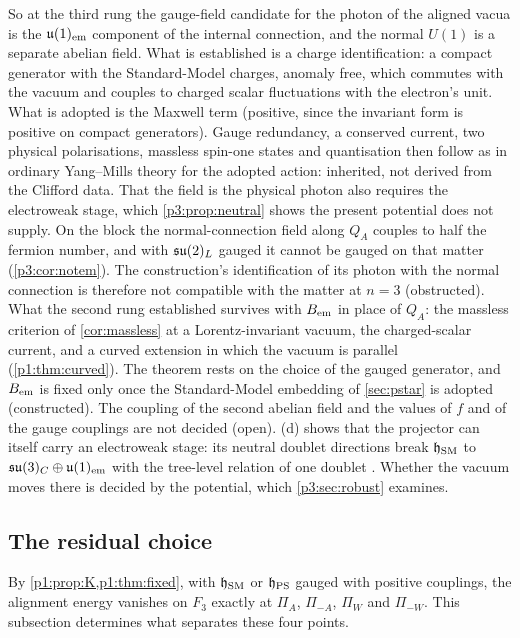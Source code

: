 So at the third rung the gauge-field candidate for the photon of the aligned vacua is the $\mathfrak{u}(1)_{\rm em}$ component of the internal connection, and the normal
$U(1)$ is a separate abelian field. What is established is a charge identification: a compact generator with the Standard-Model charges, anomaly free, which
commutes with the vacuum and couples to charged scalar fluctuations with the electron's unit. What is adopted is the Maxwell term (positive, since the
invariant form is positive on compact generators). Gauge redundancy, a conserved current, two physical polarisations, massless spin-one states and
quantisation then follow as in ordinary Yang--Mills theory for the adopted action: inherited, not derived from the Clifford data. That the field is the
physical photon also requires the electroweak stage, which \cref{p3:prop:neutral} shows the present potential does not supply. On
the block the normal-connection field along $Q_A$ couples to half the fermion number, and with $\mathfrak{su}(2)_L$ gauged it cannot be gauged on that matter (\cref{p3:cor:notem}). The construction's
identification of its photon with the normal connection is therefore not compatible with the matter at $n=3$ (obstructed). What the second rung established survives
with $B_{\rm em}$ in place of $Q_A$: the massless criterion of \cref{cor:massless} at a Lorentz-invariant vacuum, the charged-scalar current, and a curved extension in which
the vacuum is parallel (\cref{p1:thm:curved}). The theorem rests on the choice of the gauged generator, and $B_{\rm em}$ is fixed only once the Standard-Model embedding of
\cref{sec:pstar} is adopted (constructed). The coupling of the second abelian field and the values of $f$ and of the gauge couplings are not decided (open).
(d) shows that the projector can itself carry an electroweak stage: its neutral doublet directions break $\mathfrak h_{\rm SM}$ to
$\mathfrak{su}(3)_C\oplus\mathfrak{u}(1)_{\rm em}$ with the tree-level relation of one doublet \cite{Glashow61,Weinberg67}. Whether the vacuum moves there is decided by the potential, which
\cref{p3:sec:robust} examines.

\subsection{The residual choice}
\label{p3:sec:residual}

By \cref{p1:prop:K,p1:thm:fixed}, with $\mathfrak h_{\rm SM}$ or $\mathfrak h_{\rm PS}$ gauged with positive couplings, the alignment energy vanishes on $F_3$ exactly at
$\Pi_A$, $\Pi_{-A}$, $\Pi_W$ and $\Pi_{-W}$. This subsection determines what separates these four points.

